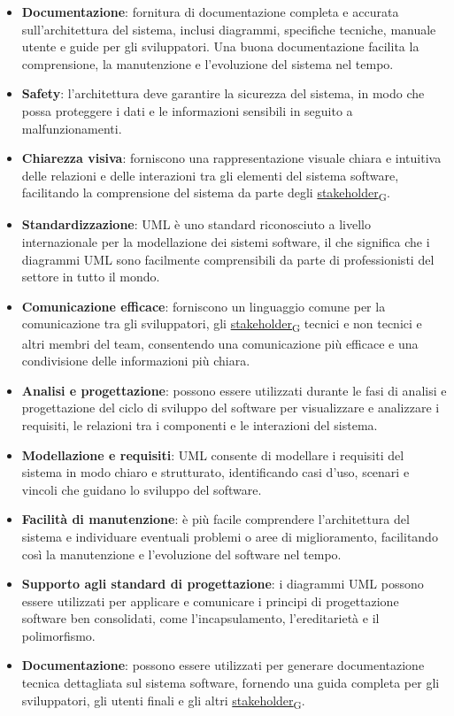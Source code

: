 \begin{itemize}
	\item \textbf{Documentazione}: fornitura di documentazione completa e accurata sull'architettura del sistema, inclusi diagrammi, specifiche tecniche, manuale utente e guide per gli sviluppatori. Una buona documentazione facilita la comprensione, la manutenzione e l'evoluzione del sistema nel tempo.
	\item \textbf{Safety}: l'architettura deve garantire la sicurezza del sistema, in modo che possa proteggere i dati e le informazioni sensibili in seguito a malfunzionamenti.
\end{itemize}

\begin{itemize}
	\item \textbf{Chiarezza visiva}: forniscono una rappresentazione visuale chiara e intuitiva delle relazioni e delle interazioni tra gli elementi del sistema software, facilitando la comprensione del sistema da parte degli \href{https://7last.github.io/docs/rtb/documentazione-interna/glossario\#stakeholder}{stakeholder\textsubscript{G}}.
	\item \textbf{Standardizzazione}: UML è uno standard riconosciuto a livello internazionale per la modellazione dei sistemi software, il che significa che i diagrammi UML sono facilmente comprensibili da parte di professionisti del settore in tutto il mondo.
	\item \textbf{Comunicazione efficace}: forniscono un linguaggio comune per la comunicazione tra gli sviluppatori, gli \href{https://7last.github.io/docs/rtb/documentazione-interna/glossario\#stakeholder}{stakeholder\textsubscript{G}} tecnici e non tecnici e altri membri del team, consentendo una comunicazione più efficace e una condivisione delle informazioni più chiara.
	\item \textbf{Analisi e progettazione}: possono essere utilizzati durante le fasi di analisi e progettazione del ciclo di sviluppo del software per visualizzare e analizzare i requisiti, le relazioni tra i componenti e le interazioni del sistema.
	\item \textbf{Modellazione e requisiti}: UML consente di modellare i requisiti del sistema in modo chiaro e strutturato, identificando casi d'uso, scenari e vincoli che guidano lo sviluppo del software.
	\item \textbf{Facilità di manutenzione}: è più facile comprendere l'architettura del sistema e individuare eventuali problemi o aree di miglioramento, facilitando così la manutenzione e l'evoluzione del software nel tempo.
	\item \textbf{Supporto agli standard di progettazione}: i diagrammi UML possono essere utilizzati per applicare e comunicare i principi di progettazione software ben consolidati, come l'incapsulamento, l'ereditarietà e il polimorfismo.
	\item \textbf{Documentazione}: possono essere utilizzati per generare documentazione tecnica dettagliata sul sistema software, fornendo una guida completa per gli sviluppatori, gli utenti finali e gli altri \href{https://7last.github.io/docs/rtb/documentazione-interna/glossario\#stakeholder}{stakeholder\textsubscript{G}}.
\end{itemize}

